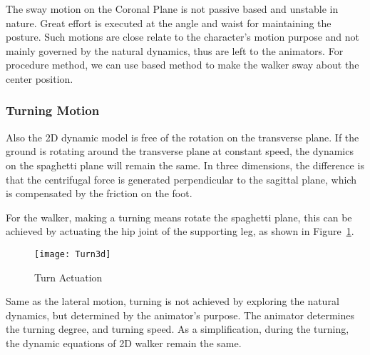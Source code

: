 {The sway motion on the Coronal Plane is not passive based and unstable in nature\citep{kuo1999stabilization}.
Great effort is executed at the angle and waist for maintaining the posture.
Such motions are close relate to the character's motion purpose and not mainly governed by the natural dynamics, thus are left to the animators.
For procedure method, we can use \pd based method to make the walker sway about the center position.


\subsubsection*{Turning Motion}
Also the 2D dynamic model is free of the rotation on the transverse plane.
If the ground is rotating around the transverse plane at constant speed, the dynamics on the spaghetti plane will remain the same.
In three dimensions, the difference is that the centrifugal force is generated perpendicular to the sagittal plane, which is  compensated by the friction on the foot.

For the walker,  making a turning means rotate the spaghetti plane, this can be achieved by actuating the  hip joint of the supporting leg, as shown in Figure~\ref{fig:turn}.


\begin{figure}[!htbp]
  \begin{center}
      \texttt{[image: Turn3d]}
    \caption{Turn Actuation}
    \label{fig:turn}
\end{center}
\end{figure}


Same as the lateral motion, turning is not achieved by exploring the natural dynamics, but determined by the animator's purpose.
The animator determines the turning degree, and turning speed.
As a simplification, during the turning, the dynamic equations of 2D walker remain the same.





}
